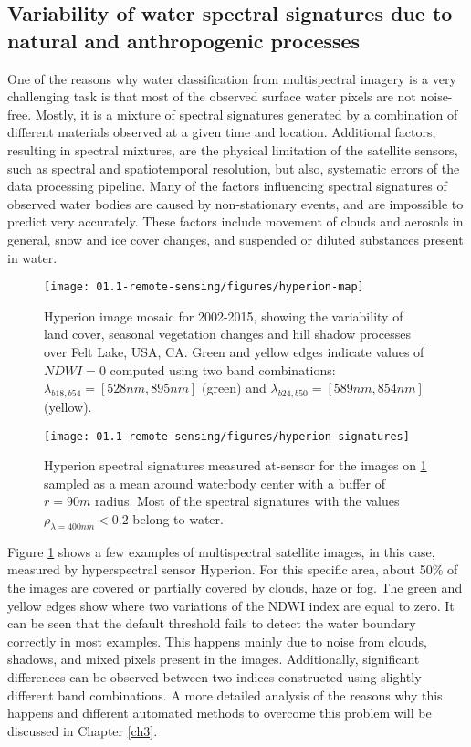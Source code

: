 \subsection{Variability of water spectral signatures due to natural and anthropogenic processes}

One of the reasons why water classification from multispectral imagery is a very challenging task is that most of the observed surface water pixels are not noise-free. Mostly, it is a mixture of spectral signatures generated by a combination of different materials observed at a given time and location. Additional factors, resulting in spectral mixtures, are the physical limitation of the satellite sensors, such as spectral and spatiotemporal resolution, but also, systematic errors of the data processing pipeline. Many of the factors influencing spectral signatures of observed water bodies are caused by non-stationary events, and are impossible to predict very accurately. These factors include movement of clouds and aerosols in general, snow and ice cover changes, and suspended or diluted substances present in water.

\begin{figure}
	\texttt{[image: 01.1-remote-sensing/figures/hyperion-map]}
	\caption{Hyperion image mosaic for 2002-2015, showing the variability of land cover, seasonal vegetation changes and hill shadow processes over Felt Lake, USA, CA. Green and yellow edges indicate values of $NDWI=0$ computed using two band combinations: $\lambda_{b18, b54} = [528nm, 895nm]$ (green) and $\lambda_{b24, b50} = [589nm, 854nm]$ (yellow).
	}
	\label{fig:intro-hyperion-example}
	
\end{figure}

\begin{figure}
	\texttt{[image: 01.1-remote-sensing/figures/hyperion-signatures]}
	\caption{Hyperion spectral signatures measured at-sensor for the images on \ref{fig:intro-hyperion-example} sampled as a mean around waterbody center with a buffer of $r=90m$ radius. Most of the spectral signatures with the values $\rho_{\lambda = 400nm} < 0.2$ belong to water.} 
	\label{fig:intro-hyperion-example-signatures}
\end{figure}

Figure \ref{fig:intro-hyperion-example} shows a few examples of multispectral satellite images, in this case, measured by hyperspectral sensor Hyperion. For this specific area, about 50\% of the images are covered or partially covered by clouds, haze or fog. The green and yellow edges show where two variations of the \gls{NDWI} index are equal to zero. It can be seen that the default threshold fails to detect the water boundary correctly in most examples. This happens mainly due to noise from clouds, shadows, and mixed pixels present in the images. Additionally, significant differences can be observed between two indices constructed using slightly different band combinations. A more detailed analysis of the reasons why this happens and different automated methods to overcome this problem will be discussed in Chapter \ref{ch3}.

